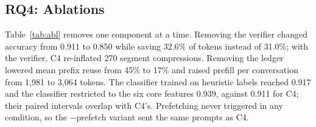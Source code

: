 \documentclass[journal]{IEEEtran}
\begin{document}
\subsection{RQ4: Ablations}
\begin{table}[t]\centering\caption{Ablations of C4 over 180 questions. Prefill/conv.: tokens prefilled per conversation.}\label{tab:abl}
\end{table}
Table~\ref{tab:abl} removes one component at a time. Removing the verifier changed accuracy from 0.911 to 0.850 while saving 32.6\% of tokens instead of 31.0\%; with the verifier, C4 re-inflated 270 segment compressions. Removing the ledger lowered mean prefix reuse from 45\% to 17\% and raised prefill per conversation from 1,981 to 3,064 tokens. The classifier trained on heuristic labels reached 0.917 and the classifier restricted to the six core features 0.939, against 0.911 for C4; their paired intervals overlap with C4's. Prefetching never triggered in any condition, so the $-$prefetch variant sent the same prompts as C4.
\end{document}
